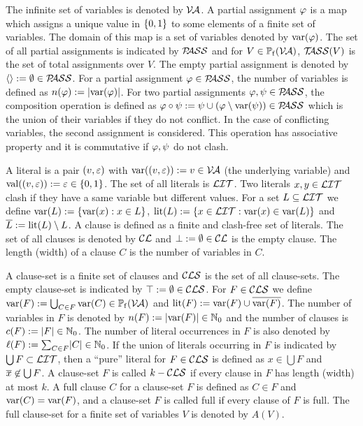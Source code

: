 \documentclass{report}
\begin{document}
The infinite set of variables is denoted by $\mathcal{V\hspace{-0.1em}A}$. A partial assignment $\varphi$ is a map which assigns a unique value in $\{ 0,1 \}$ to some elements of a finite set of variables. The domain of this map is a set of variables denoted by $\operatorname{var}(\varphi)$. The set of all partial assignments is indicated by $\mathcal{P\hspace{-0.32em}ASS}$ and for $V \in \operatorname{\mathbb{P}_f}(\mathcal{V\hspace{-0.1em}A})$, $\mathcal{T\hspace{-0.35em}ASS}(V)$ is the set of total assignments over $V$. The empty partial assignment is denoted by $\langle  \rangle:= \emptyset \in \mathcal{P\hspace{-0.32em}ASS}$. For a partial assignment $\varphi \in \mathcal{P\hspace{-0.32em}ASS}$, the number of variables is defined as $n(\varphi):=\lvert \operatorname{var}(\varphi) \rvert$. For two partial assignments $\varphi, \psi \in \mathcal{P\hspace{-0.32em}ASS}$, the composition operation is defined as $\varphi \circ \psi := \psi \cup (\varphi \setminus \operatorname{var}(\psi)) \in \mathcal{P\hspace{-0.32em}ASS}$ which is the union of their variables if they do not conflict. In the case of conflicting variables, the second assignment is considered. This operation has associative property and it is commutative if $\varphi, \psi$ do not clash.

A literal is a pair $(v,\varepsilon)$ with $\operatorname{var}((v,\varepsilon)):=v \in \mathcal{V\hspace{-0.1em}A}$ (the underlying variable) and $\operatorname{val}((v,\varepsilon)):=\varepsilon \in \{ 0,1 \}$. The set of all literals is $\mathcal{LIT}$. Two literals $x, y \in \mathcal{LIT}$ clash if they have a same variable but different values. For a set $L \subseteq \mathcal{LIT}$ we define $\operatorname{var}(L) := \{ \operatorname{var}(x) :x \in L \}$, $\operatorname{lit}(L):= \{ x \in \mathcal{LIT} : \operatorname{var}(x) \in \operatorname{var}(L) \}$ and $\overline{L} := \operatorname{lit}(L) \setminus L$. A clause is defined as a finite and clash-free set of literals. The set of all clauses is denoted by $\mathcal{CL}$ and $\bot := \emptyset \in \mathcal{CL}$ is the empty clause. The length (width) of a clause $C$ is the number of variables in $C$.

A clause-set is a finite set of clauses and $\mathcal{CLS}$ is the set of all clause-sets. The empty clause-set is indicated by $\top := \emptyset \in \mathcal{CLS}$. For $F \in \mathcal{CLS}$ we define $\operatorname{var}(F) := \bigcup_{C \in F} \operatorname{var}(C) \in \operatorname{\mathbb{P}_f}(\mathcal{V\hspace{-0.1em}A})$ and $\operatorname{lit}(F) := \operatorname{var}(F) \cup \overline{\operatorname{var}(F)}$. The number of variables in $F$ is denoted by $n(F) := \lvert \operatorname{var}(F) \rvert \in \mathbb{N}_0$ and the number of clauses is $c(F) := \lvert F \rvert \in \mathbb{N}_0$. The number of literal occurrences in $F$ is also denoted by $\ell(F) := \sum_{C \in F} \lvert C \rvert \in \mathbb{N}_0$. If the union of literals occurring in $F$ is indicated by $\bigcup F \subset \mathcal{LIT}$, then a ``pure'' literal for $F \in \mathcal{CLS}$ is defined as $x \in \bigcup F$ and $\overline{x} \not \in \bigcup F$. A clause-set $F$ is called $k-\mathcal{CLS}$ if every clause in $F$ has length (width) at most $k$. A full clause $C$  for a clause-set $F$ is defined as $C \in F$ and $\operatorname{var}(C) = \operatorname{var}(F)$, and a clause-set $F$ is called full if every clause of $F$ is full. The full clause-set for a finite set of variables $V$ is denoted by $A(V)$. 
\end{document}
